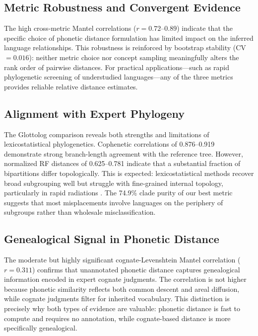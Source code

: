 \documentclass[manuscript]{clv2025}
\begin{document}
\subsection{Metric Robustness and Convergent Evidence}

The high cross-metric Mantel correlations ($r = 0.72$--$0.89$) indicate that the specific choice of phonetic distance formulation has limited impact on the inferred language relationships. This robustness is reinforced by bootstrap stability (CV $= 0.016$): neither metric choice nor concept sampling meaningfully alters the rank order of pairwise distances. For practical applications---such as rapid phylogenetic screening of understudied languages---any of the three metrics provides reliable relative distance estimates.

\subsection{Alignment with Expert Phylogeny}

The Glottolog comparison reveals both strengths and limitations of lexicostatistical phylogenetics. Cophenetic correlations of 0.876--0.919 demonstrate strong branch-length agreement with the reference tree. However, normalized RF distances of 0.625--0.781 indicate that a substantial fraction of bipartitions differ topologically. This is expected: lexicostatistical methods recover broad subgrouping well but struggle with fine-grained internal topology, particularly in rapid radiations \cite{gray2009pnas}. The 74.9\% clade purity of our best metric suggests that most misplacements involve languages on the periphery of subgroups rather than wholesale misclassification.

\subsection{Genealogical Signal in Phonetic Distance}

The moderate but highly significant cognate-Levenshtein Mantel correlation ($r = 0.311$) confirms that unannotated phonetic distance captures genealogical information encoded in expert cognate judgments. The correlation is not higher because phonetic similarity reflects both common descent and areal diffusion, while cognate judgments filter for inherited vocabulary. This distinction is precisely why both types of evidence are valuable: phonetic distance is fast to compute and requires no annotation, while cognate-based distance is more specifically genealogical.
\end{document}
